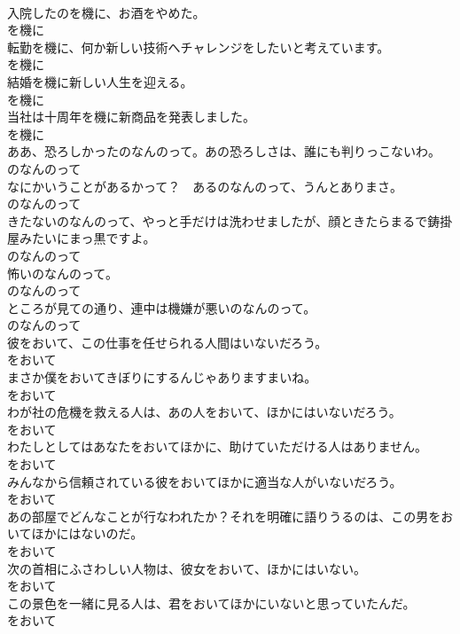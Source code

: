 \documentclass[8pt]{extreport}
\begin{document}
\begin{CJK}{UTF8}{min}
\\	入院したのを機に、お酒をやめた。	
\\	を機に
\\	転勤を機に、何か新しい技術へチャレンジをしたいと考えています。	
\\	を機に
\\	結婚を機に新しい人生を迎える。	
\\	を機に
\\	当社は十周年を機に新商品を発表しました。	
\\	を機に
\\	ああ、恐ろしかったのなんのって。あの恐ろしさは、誰にも判りっこないわ。	
\\	のなんのって
\\	なにかいうことがあるかって？　あるのなんのって、うんとありまさ。	
\\	のなんのって
\\	きたないのなんのって、やっと手だけは洗わせましたが、顔ときたらまるで鋳掛屋みたいにまっ黒ですよ。	
\\	のなんのって
\\	怖いのなんのって。	
\\	のなんのって
\\	ところが見ての通り、連中は機嫌が悪いのなんのって。	
\\	のなんのって
\\	彼をおいて、この仕事を任せられる人間はいないだろう。	
\\	をおいて
\\	まさか僕をおいてきぼりにするんじゃありますまいね。	
\\	をおいて
\\	わが社の危機を救える人は、あの人をおいて、ほかにはいないだろう。	
\\	をおいて
\\	わたしとしてはあなたをおいてほかに、助けていただける人はありません。	
\\	をおいて
\\	みんなから信頼されている彼をおいてほかに適当な人がいないだろう。	
\\	をおいて
\\	あの部屋でどんなことが行なわれたか？それを明確に語りうるのは、この男をおいてほかにはないのだ。	
\\	をおいて
\\	次の首相にふさわしい人物は、彼女をおいて、ほかにはいない。	
\\	をおいて
\\	この景色を一緒に見る人は、君をおいてほかにいないと思っていたんだ。	
\\	をおいて

\end{CJK}
\end{document}

